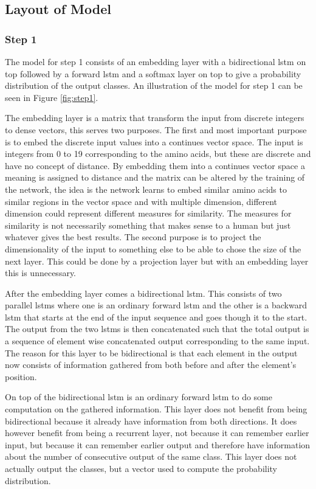 \subsection{Layout of Model}

\subsubsection{Step 1}
The model for step 1 consists of an embedding layer with a bidirectional \gls{lstm} on top followed by a
forward \gls{lstm} and a softmax layer on top to give a probability distribution of the output classes.
An illustration of the model for step 1 can be seen in Figure \ref{fig:step1}.

The embedding layer is a matrix that transform the input from discrete integers to dense vectors, 
this serves two purposes. The first and most important purpose is to embed the discrete input values 
into a continues vector space. The input is integers from 0 to 19 corresponding to the amino acids, but 
these are discrete and have no concept of distance. By embedding them into a continues vector space 
a meaning is assigned to distance and the matrix can be altered by the training of the network, 
the idea is the network learns to embed similar amino acids to similar regions in the vector space
and with multiple dimension, different dimension could represent different measures for similarity. 
The measures for similarity is not necessarily something that makes sense to a human but just whatever 
gives the best results. The second purpose is to project the dimensionality of the input to something else 
to be able to chose the size of the next layer. This could be done by a projection layer but with an embedding 
layer this is unnecessary. 

After the embedding layer comes a bidirectional \gls{lstm}. This consists of two parallel \glspl{lstm} where 
one is an ordinary forward \gls{lstm} and the other is a backward \gls{lstm} that starts at the end of the 
input sequence and goes though it to the start. The output from the two \glspl{lstm} is then concatenated
such that the total output is a sequence of element wise concatenated output corresponding to the same input.
The reason for this layer to be bidirectional is that each element in the output now consists of information
gathered from both before and after the element's position. 

On top of the bidirectional \gls{lstm} is an ordinary forward \gls{lstm} to do some computation on the
gathered information. This layer does not benefit from being bidirectional because it already have 
information from both directions. It does however benefit from being a recurrent layer, not 
because it can remember earlier input, but because it can remember earlier output and therefore have
information about the number of consecutive output of the same class. This layer does not actually 
output the classes, but a vector used to compute the probability distribution.

